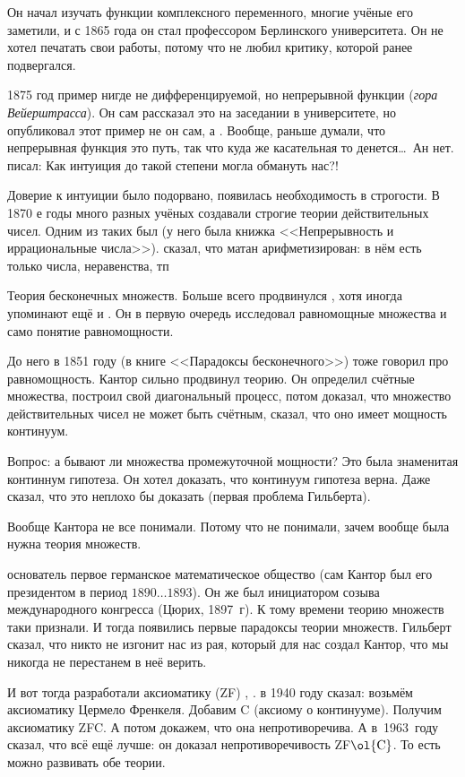 \documentclass[a4paper,oneside,fleqn,10pt]{article}
\newcommand{\pe}[2]{${#1}\ldots{#2}$}
\begin{document}
Он начал изучать функции комплексного переменного, многие учёные его
заметили, и с 1865 года он стал профессором Берлинского
университета. Он не хотел печатать свои работы, потому что не любил
критику, которой ранее подвергался.

1875 год пример нигде не дифференцируемой, но непрерывной функции
(\emph{гора Вейерштрасса}).  Он сам рассказал это на заседании в
университете, но опубликовал этот пример не он сам, а
.  Вообще, раньше думали, что непрерывная функция
это путь, так что куда же касательная то денется\ldots\ Ан
нет.  писал: Как интуиция до такой степени могла
обмануть нас?!

Доверие к интуиции было подорвано, появилась необходимость в
строгости.  В 1870 е годы много разных учёных создавали строгие теории
действительных чисел.  Одним из таких был  (у него была
книжка <<Непрерывность и иррациональные числа>>).  
сказал, что матан арифметизирован: в нём есть только числа,
неравенства, тп

Теория бесконечных множеств. Больше всего продвинулся , хотя иногда упоминают ещё и
. Он в первую очередь исследовал
равномощные множества и само понятие равномощности.

До него в 1851 году  (в книге <<Парадоксы
бесконечного>>) тоже говорил про равномощность.  Кантор сильно
продвинул теорию. Он определил счётные множества, построил свой
диагональный процесс, потом доказал, что множество действительных
чисел не может быть счётным, сказал, что оно имеет мощность континуум.

Вопрос: а бывают ли множества промежуточной мощности? Это была
знаменитая континнум гипотеза.  Он хотел доказать, что континуум
гипотеза верна. Даже  сказал, что это неплохо бы
доказать (первая проблема Гильберта).

Вообще Кантора не все понимали. Потому что не понимали, зачем вообще
была нужна теория множеств.

 основатель первое германское математическое общество
(сам Кантор был его президентом в период \pe{1890}{1893}).  Он же был
инициатором созыва международного конгресса (Цюрих, 1897~г).  К тому
времени теорию множеств таки признали. И тогда появились первые
парадоксы теории множеств. Гильберт сказал, что никто не изгонит нас
из рая, который для нас создал Кантор, что мы никогда не перестанем в
неё верить.

И вот тогда разработали аксиоматику (ZF) ,
.   в 1940 году сказал: возьмём
аксиоматику Цермело Френкеля.  Добавим C (аксиому о
континууме). Получим аксиоматику ZFC.  А потом докажем, что она
непротиворечива.  А в~1963~году  сказал, что всё ещё лучше:
он доказал непротиворечивость ZF$\ol{\rm C}$.  То есть можно развивать
обе теории.
\end{document}
